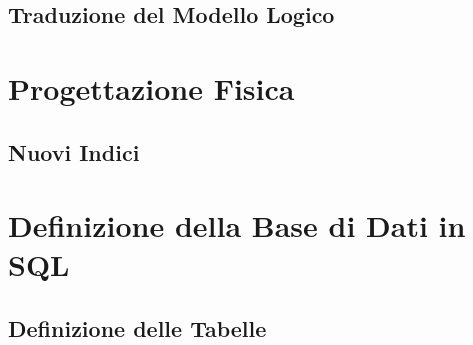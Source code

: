 \documentclass{article}
\begin{document}
\subsection{Traduzione del Modello Logico}


% 
% 
% 
% 
% 
% 




\clearpage
\section{Progettazione Fisica}
\subsection{Nuovi Indici}



\clearpage
\section{Definizione della Base di Dati in SQL}
\subsection{Definizione delle Tabelle}
\end{document}
